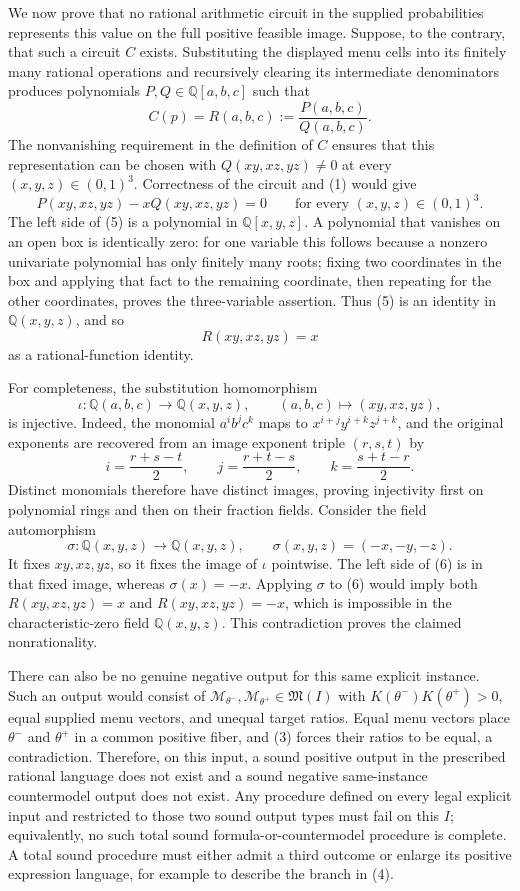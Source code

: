 We now prove that no rational arithmetic circuit in the supplied probabilities represents this value on the full positive feasible image.  Suppose, to the contrary, that such a circuit \(C\) exists.  Substituting the displayed menu cells into its finitely many rational operations and recursively clearing its intermediate denominators produces polynomials \(P,Q\in\mathbb Q[a,b,c]\) such that
\[
 C(p)=R(a,b,c):=\frac{P(a,b,c)}{Q(a,b,c)}.
\]
The nonvanishing requirement in the definition of \(C\) ensures that this representation can be chosen with \(Q(xy,xz,yz)\neq0\) at every \((x,y,z)\in(0,1)^3\).  Correctness of the circuit and (1) would give
\[
 P(xy,xz,yz)-xQ(xy,xz,yz)=0
 \qquad\text{for every }(x,y,z)\in(0,1)^3. \tag{5}
\]
The left side of (5) is a polynomial in \(\mathbb Q[x,y,z]\).  A polynomial that vanishes on an open box is identically zero: for one variable this follows because a nonzero univariate polynomial has only finitely many roots; fixing two coordinates in the box and applying that fact to the remaining coordinate, then repeating for the other coordinates, proves the three-variable assertion.  Thus (5) is an identity in \(\mathbb Q(x,y,z)\), and so
\[
 R(xy,xz,yz)=x \tag{6}
\]
as a rational-function identity.

For completeness, the substitution homomorphism
\[
 \iota:\mathbb Q(a,b,c)\longrightarrow\mathbb Q(x,y,z),
 \qquad (a,b,c)\longmapsto(xy,xz,yz),
\]
is injective.  Indeed, the monomial \(a^ib^jc^k\) maps to \(x^{i+j}y^{i+k}z^{j+k}\), and the original exponents are recovered from an image exponent triple \((r,s,t)\) by
\[
 i=\frac{r+s-t}{2},\qquad
 j=\frac{r+t-s}{2},\qquad
 k=\frac{s+t-r}{2}.
\]
Distinct monomials therefore have distinct images, proving injectivity first on polynomial rings and then on their fraction fields.  Consider the field automorphism
\[
 \sigma:\mathbb Q(x,y,z)\longrightarrow\mathbb Q(x,y,z),
 \qquad \sigma(x,y,z)=(-x,-y,-z).
\]
It fixes \(xy,xz,yz\), so it fixes the image of \(\iota\) pointwise.  The left side of (6) is in that fixed image, whereas \(\sigma(x)=-x\).  Applying \(\sigma\) to (6) would imply both \(R(xy,xz,yz)=x\) and \(R(xy,xz,yz)=-x\), which is impossible in the characteristic-zero field \(\mathbb Q(x,y,z)\).  This contradiction proves the claimed nonrationality.

There can also be no genuine negative output for this same explicit instance.  Such an output would consist of \(\mathcal M_{\theta^-},\mathcal M_{\theta^+}\in\mathfrak M(I)\) with \(K(\theta^-)K(\theta^+)>0\), equal supplied menu vectors, and unequal target ratios.  Equal menu vectors place \(\theta^-\) and \(\theta^+\) in a common positive fiber, and (3) forces their ratios to be equal, a contradiction.  Therefore, on this input, a sound positive output in the prescribed rational language does not exist and a sound negative same-instance countermodel output does not exist.  Any procedure defined on every legal explicit input and restricted to those two sound output types must fail on this \(I\); equivalently, no such total sound formula-or-countermodel procedure is complete.  A total sound procedure must either admit a third outcome or enlarge its positive expression language, for example to describe the branch in (4).


